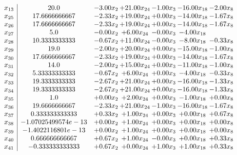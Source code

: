 \documentclass[8pt]{article}
\begin{document}
\[\begin{array}{c| c c@{\hskip 2pt} c@{\hskip 2pt} c@{\hskip 2pt} c@{\hskip 2pt} c@{\hskip 2pt} }
 x_{13}   &  20.0 & -3.00 x_{2} & + 21.00 x_{24} & -1.00 x_{3} & -16.00 x_{18} & -2.00 x_{8}\\
 x_{25}   &  17.6666666667 & -2.33 x_{2} & + 19.00 x_{24} & +  0.00 x_{3} & -14.00 x_{18} & -1.67 x_{8}\\
 x_{26}   &  17.6666666667 & -2.33 x_{2} & + 19.00 x_{24} & +  0.00 x_{3} & -14.00 x_{18} & -1.67 x_{8}\\
 x_{27}   &  5.0 & -0.00 x_{2} & +  6.00 x_{24} & -0.00 x_{3} & -4.00 x_{18} &   \\
 x_{28}   &  10.3333333333 & -0.67 x_{2} & + 11.00 x_{24} & -0.00 x_{3} & -8.00 x_{18} & -0.33 x_{8}\\
 x_{29}   &  19.0 & -2.00 x_{2} & + 20.00 x_{24} & +  0.00 x_{3} & -15.00 x_{18} & -1.00 x_{8}\\
 x_{30}   &  17.6666666667 & -2.33 x_{2} & + 19.00 x_{24} & +  0.00 x_{3} & -14.00 x_{18} & -1.67 x_{8}\\
 x_{31}   &  14.0 & -2.00 x_{2} & + 15.00 x_{24} & +  0.00 x_{3} & -11.00 x_{18} & -1.00 x_{8}\\
 x_{32}   &  5.33333333333 & -0.67 x_{2} & +  6.00 x_{24} & +  0.00 x_{3} & -4.00 x_{18} & -0.33 x_{8}\\
 x_{33}   &  19.3333333333 & -2.67 x_{2} & + 21.00 x_{24} & +  0.00 x_{3} & -16.00 x_{18} & -1.33 x_{8}\\
 x_{34}   &  19.3333333333 & -2.67 x_{2} & + 21.00 x_{24} & +  0.00 x_{3} & -16.00 x_{18} & -1.33 x_{8}\\
 x_{35}   &  1.0 & +  0.00 x_{2} & +  2.00 x_{24} & +  0.00 x_{3} & -1.00 x_{18} & +  0.00 x_{8}\\
 x_{36}   &  19.6666666667 & -2.33 x_{2} & + 21.00 x_{24} & -1.00 x_{3} & -16.00 x_{18} & -1.67 x_{8}\\
 x_{37}   &  0.333333333333 & +  0.33 x_{2} & +  1.00 x_{24} & +  0.00 x_{3} & +  0.00 x_{18} & +  0.67 x_{8}\\
 x_{38}   &  -1.07025499574e-13 & +  0.00 x_{2} & +  1.00 x_{24} & +  0.00 x_{3} & +  0.00 x_{18} & +  0.00 x_{8}\\
 x_{39}   &  -1.4022116801e-13 & +  0.00 x_{2} & +  1.00 x_{24} & +  0.00 x_{3} & +  0.00 x_{18} & +  0.00 x_{8}\\
 x_{40}   &  0.666666666667 & +  0.67 x_{2} & +  1.00 x_{24} & -0.00 x_{3} & +  0.00 x_{18} & +  0.33 x_{8}\\
 x_{41}   &  -0.333333333333 & +  0.67 x_{2} & +  0.00 x_{24} & +  1.00 x_{3} & +  1.00 x_{18} & +  0.33 x_{8}\\

\end{array}\]
\end{document}
